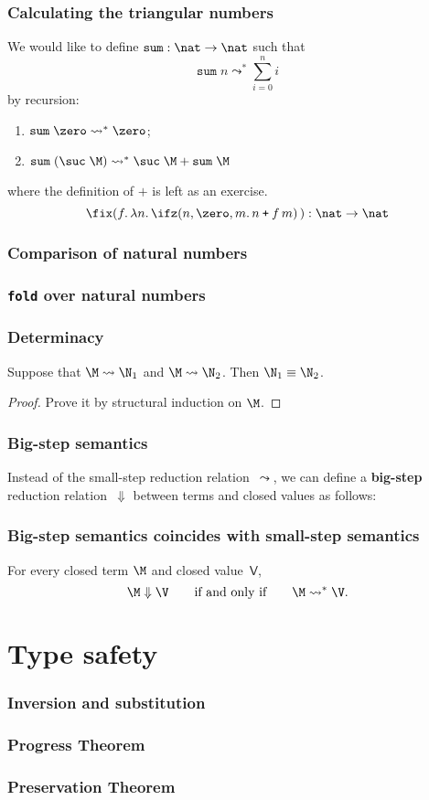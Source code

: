 \begin{frame}
  \frametitle{Calculating the triangular numbers}
  We would like to define $\mathtt{sum}:\nat \to\nat$ such that 
  \[
    \mathtt{sum}\; n \leadsto^* \sum_{i = 0}^n i 
  \]
  by recursion:
  \begin{enumerate}
    \item $\mathtt{sum}\;\zero \leadsto^* \zero$; 
    \item $\mathtt{sum}\;(\suc\;\M) \leadsto^*
      \suc\; \M\mathbin{\mathtt{+}}\mathtt{sum}\;\M$
  \end{enumerate}
  where the definition of $\texttt{+}$ is left as an exercise.
  \begin{equation}
    \label{eq:triangular_num}
    \fix(f .\, \lambda n .\, \ifz(n, \zero, m .\, n
    \mathbin{\texttt{+}} f\, m)\,) : \nat \to \nat
  \end{equation}
\end{frame}
\begin{frame}
  \frametitle{Comparison of natural numbers}
\end{frame}
\begin{frame}
  \frametitle{\texttt{fold} over natural numbers}
\end{frame}
\begin{frame}
  \frametitle{Determinacy}
  \begin{theorem}
    Suppose that
    $\M \leadsto \N_1$ and $\M \leadsto \N_2$. Then $\N_1 \equiv \N_2$. 
  \end{theorem}
  \begin{proof}
    Prove it by structural induction on $\M$. 
  \end{proof}
\end{frame}
\begin{frame}
  \frametitle{Big-step semantics}
  Instead of the small-step reduction relation~$\leadsto$, we can define a
  \textbf{big-step} reduction relation~$\Downarrow$
  between terms and \alert{closed values} as follows: 
\end{frame}
\begin{frame}
  \frametitle{Big-step semantics coincides with small-step semantics}
  \begin{theorem}
    For every closed term $\M$ and closed value~$\mathsf{V}$, 
    \[
      \M \Downarrow \V
      \qquad
      \text{if and only if}
      \qquad
      \M \leadsto^* \V. 
    \]
  \end{theorem}
\end{frame}
\section{Type safety}
\begin{frame}
  \frametitle{Inversion and substitution}
\end{frame}
\begin{frame}
\end{frame}
\begin{frame}
  \frametitle{Progress Theorem}
\end{frame}
\begin{frame}
  \frametitle{Preservation Theorem}
\end{frame}
